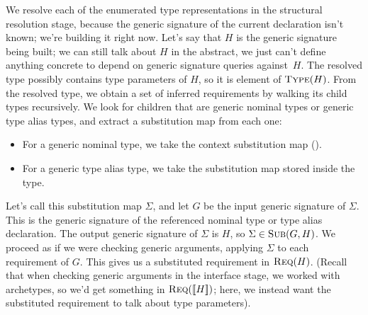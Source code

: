 \documentclass[../generics]{subfiles}
\begin{document}
We resolve each of the enumerated type representations in the structural resolution stage, because the generic signature of the current declaration isn't known; we're building it right now. Let's say that $H$ is the generic signature being built; we can still talk about $H$ in the abstract, we just can't define anything concrete to depend on generic signature queries against~$H$. The resolved type possibly contains type parameters of $H$, so it is element of $\textsc{Type}({H})$. From the resolved type, we obtain a set of inferred requirements by walking its child types recursively. We look for children that are generic nominal types or generic type alias types, and extract a substitution map from each one:
\begin{itemize}
\item For a generic nominal type, we take the context substitution map ().
\item For a generic type alias type, we take the substitution map stored inside the type.
\end{itemize}
Let's call this substitution map $\Sigma$, and let $G$ be the input generic signature of $\Sigma$. This is the generic signature of the referenced nominal type or type alias declaration. The output generic signature of $\Sigma$ is $H$, so $\Sigma\in\textsc{Sub}({G, H})$. We proceed as if we were checking generic arguments, applying $\Sigma$ to each requirement of $G$. This gives us a substituted requirement in $\textsc{Req}({H})$. (Recall that when checking generic arguments in the interface stage, we worked with archetypes, so we'd get something in $\textsc{Req}({[\![H]\!]})$; here, we instead want the substituted requirement to talk about type parameters).
\end{document}
